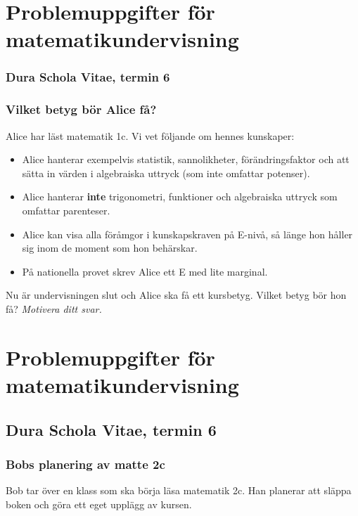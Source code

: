 \part*{Problemuppgifter för matematikundervisning}

\section{Dura Schola Vitae, termin 6}

\setcounter{section}{0}
\section{Vilket betyg bör Alice få?}
Alice har läst matematik 1c. Vi vet följande om hennes kunskaper:

\begin{itemize}
  \item Alice hanterar exempelvis statistik, sannolikheter, förändringsfaktor och att sätta in värden i algebraiska uttryck (som inte omfattar potenser).
  \item Alice hanterar \textbf{inte} trigonometri, funktioner och algebraiska uttryck som omfattar parenteser.
  \item Alice kan visa alla föråmgor i kunskapskraven på E-nivå, så länge hon håller sig inom de moment som hon behärskar.
  \item På nationella provet skrev Alice ett E med lite marginal.
\end{itemize}

\noindent Nu är undervisningen slut och Alice ska få ett kursbetyg. Vilket betyg bör hon få? \emph{Motivera ditt svar.}



\newpage
\part*{Problemuppgifter för matematikundervisning}

\chapter{Dura Schola Vitae, termin 6}

\section{Bobs planering av matte 2c}
Bob tar över en klass som ska börja läsa matematik 2c. Han planerar att släppa boken och göra ett eget upplägg av kursen.

